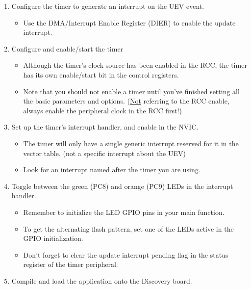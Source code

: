 \documentclass[openany,11pt,fleqn]{book} %
\begin{document}
\begin{exercise}
\begin{enumerate}
\begin{itemize}
            \end{itemize}    
            \item Configure the timer to generate an interrupt on the UEV event.     
                \begin{itemize}
                    \item Use the DMA/Interrupt Enable Register (DIER) to enable the update interrupt. 
                \end{itemize}
             \item Configure and enable/start the timer
             \begin{itemize}
                 \item Although the timer's clock source has been enabled in the RCC, the timer has its own enable/start bit in the control registers. 
                 \item Note that you should not enable a timer until you've finished setting all the basic parameters and options. (\underline{Not} referring to the RCC enable, always enable the peripheral clock in the RCC first!)
             \end{itemize}
             \item Set up the timer's interrupt handler, and enable in the NVIC.
             \begin{itemize}
                \item The timer will only have a single generic interrupt reserved for it in the vector table. (not a specific interrupt about the UEV) 
                \item Look for an interrupt named after the timer you are using. 
            \end{itemize}
            \item Toggle between the green (PC8) and orange (PC9) LEDs in the interrupt handler. 
            \begin{itemize}
                \item Remember to initialize the LED GPIO pins in your main function. 
                \item To get the alternating flash pattern, set one of the LEDs active in the GPIO initialization.
                \item Don't forget to clear the update interrupt pending flag in the status register of the timer peripheral. 
            \end{itemize}
            \item Compile and load the application onto the Discovery board.
        \end{enumerate}
        
    \end{exercise}
\end{document}
